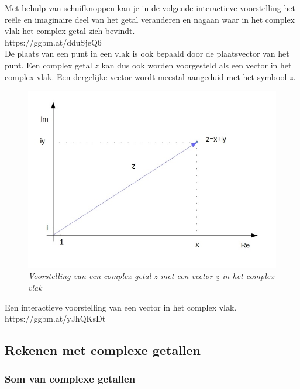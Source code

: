 Met behulp van schuifknoppen kan je in de volgende interactieve voorstelling het re\"{e}le en imaginaire deel van het getal veranderen en nagaan waar in het complex vlak het complex getal zich bevindt.\\

https://ggbm.at/dduSjeQ6  \\

De plaats van een punt in een vlak is ook bepaald door de plaatsvector van het punt. Een complex getal $z$ kan dus ook worden voorgesteld als een vector in het complex vlak. Een dergelijke vector wordt meestal aangeduid met het symbool $\underline{z}$.\\

\begin{figure}[h]
	\begin{center}
		\includegraphics[scale=0.6]{3_gonio_complexe_getallen/inputs/complex-getal-2.jpg}
	\end{center}
	\caption{\it Voorstelling van een complex getal $z$ met een vector $\underline{z}$ in het complex vlak}
\end{figure}

Een interactieve voorstelling van een vector in het complex vlak.\\

https://ggbm.at/yJhQKsDt  \\

\subsection{Rekenen met complexe getallen}

\subsubsection{Som van complexe getallen}

